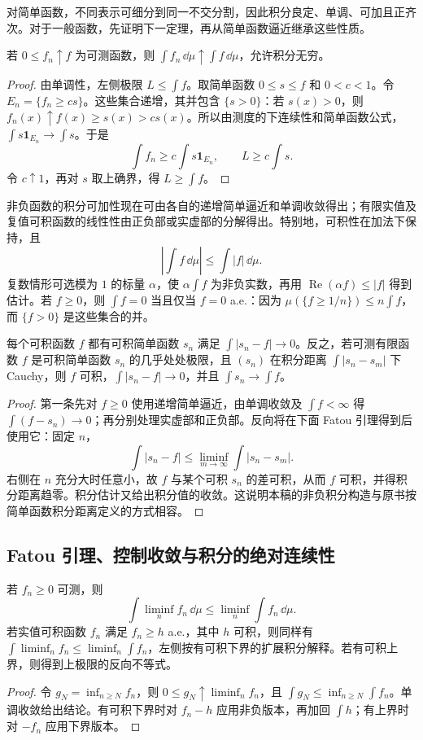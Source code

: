 对简单函数，不同表示可细分到同一不交分割，因此积分良定、单调、可加且正齐次。对于一般函数，先证明下一定理，再从简单函数逼近继承这些性质。

\begin{theorem}[单调收敛定理]\label{thm:y0-monotone}
若 $0\le f_n\uparrow f$ 为可测函数，则 $\int f_n\,\dd\mu\uparrow\int f\,\dd\mu$，允许积分无穷。
\end{theorem}
\begin{proof}
由单调性，左侧极限 $L\le\int f$。取简单函数 $0\le s\le f$ 和 $0<c<1$。令 $E_n=\{f_n\ge cs\}$。这些集合递增，其并包含 $\{s>0\}$：若 $s(x)>0$，则 $f_n(x)\uparrow f(x)\ge s(x)>cs(x)$。所以由测度的下连续性和简单函数公式，$\int s\mathbf1_{E_n}\to\int s$。于是
\[
 \int f_n\ge c\int s\mathbf1_{E_n},\qquad
 L\ge c\int s.
\]
令 $c\uparrow1$，再对 $s$ 取上确界，得 $L\ge\int f$。
\end{proof}

非负函数的积分可加性现在可由各自的递增简单逼近和单调收敛得出；有限实值及复值可积函数的线性性由正负部或实虚部的分解得出。特别地，可积性在加法下保持，且
\[
 \left|\int f\,\dd\mu\right|\le\int|f|\,\dd\mu.
\]
复数情形可选模为 $1$ 的标量 $\alpha$，使 $\alpha\int f$ 为非负实数，再用 $\operatorname{Re}(\alpha f)\le|f|$ 得到估计。若 $f\ge0$，则 $\int f=0$ 当且仅当 $f=0$ a.e.：因为 $\mu(\{f\ge1/n\})\le n\int f$，而 $\{f>0\}$ 是这些集合的并。

\begin{proposition}[与简单函数逼近定义的相容性]\label{prop:y0-simple-l1}
每个可积函数 $f$ 都有可积简单函数 $s_n$ 满足 $\int|s_n-f|\to0$。反之，若可测有限函数 $f$ 是可积简单函数 $s_n$ 的几乎处处极限，且 $(s_n)$ 在积分距离 $\int|s_n-s_m|$ 下 Cauchy，则 $f$ 可积，$\int|s_n-f|\to0$，并且 $\int s_n\to\int f$。
\end{proposition}
\begin{proof}
第一条先对 $f\ge0$ 使用递增简单逼近，由单调收敛及 $\int f<\infty$ 得 $\int(f-s_n)\to0$；再分别处理实虚部和正负部。反向将在下面 Fatou 引理得到后使用它：固定 $n$，
\[
 \int|s_n-f|\le\liminf_{m\to\infty}\int|s_n-s_m|.
\]
右侧在 $n$ 充分大时任意小，故 $f$ 与某个可积 $s_n$ 的差可积，从而 $f$ 可积，并得积分距离趋零。积分估计又给出积分值的收敛。这说明本稿的非负积分构造与原书按简单函数积分距离定义的方式相容。
\end{proof}

\subsection{Fatou 引理、控制收敛与积分的绝对连续性}
\begin{theorem}[Fatou 引理]\label{thm:y0-fatou}
若 $f_n\ge0$ 可测，则
\[
 \int\liminf_nf_n\,\dd\mu\le\liminf_n\int f_n\,\dd\mu.
\]
若实值可积函数 $f_n$ 满足 $f_n\ge h$ a.e.，其中 $h$ 可积，则同样有 $\int\liminf_nf_n\le\liminf_n\int f_n$，左侧按有可积下界的扩展积分解释。若有可积上界，则得到上极限的反向不等式。
\end{theorem}
\begin{proof}
令 $g_N=\inf_{n\ge N}f_n$，则 $0\le g_N\uparrow\liminf_nf_n$，且 $\int g_N\le\inf_{n\ge N}\int f_n$。单调收敛给出结论。有可积下界时对 $f_n-h$ 应用非负版本，再加回 $\int h$；有上界时对 $-f_n$ 应用下界版本。
\end{proof}

